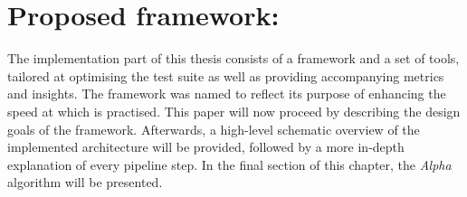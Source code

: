
\chapter{Proposed framework: \velocity{}}
\label{chap:velocity}

The implementation part of this thesis consists of a framework and a set of tools, tailored at optimising the test suite as well as providing accompanying metrics and insights. The framework was named \emph{\velocity{}} to reflect its purpose of enhancing the speed at which \CI{} is practised. This paper will now proceed by describing the design goals of the framework. Afterwards, a high-level schematic overview of the implemented architecture will be provided, followed by a more in-depth explanation of every pipeline step. In the final section of this chapter, the \emph{Alpha} algorithm will be presented.




